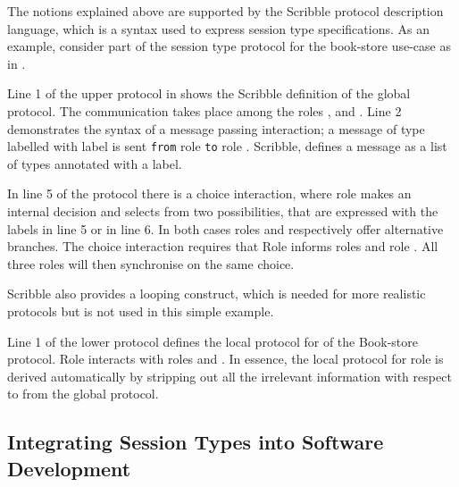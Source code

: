 \label{sec:scribble}
The notions explained above are supported by the
Scribble protocol description language,
which is a syntax used to express session type specifications.
As an example,
consider part of the session type protocol for the book-store
use-case as in .




Line 1 of the upper protocol in  shows the
Scribble definition of the global protocol.
The communication takes place
among the roles \BuyerOne, \BuyerTwo and \Seller. Line 2 demonstrates
the syntax of a message passing interaction; a message
of type  labelled with label  is sent \lstinline|from|
role \BuyerOne \lstinline|to| role \Seller. Scribble, defines a message 
as a list of types annotated with a label.

In line 5 of the protocol
there is a choice interaction,
where role \BuyerTwo makes an internal decision and selects
from two possibilities, that are
expressed with the labels  in line 5 or  in line 6.
In  both cases roles \BuyerOne and \Seller respectively offer
alternative branches. The choice interaction requires that
Role \BuyerTwo informs roles \BuyerOne and role \Seller. All
three roles will then synchronise on the same choice.

Scribble also provides a looping construct, which is needed for more realistic protocols but is not used in this simple example.


Line 1 of the lower protocol defines the local protocol
for \BuyerOne of the Book-store protocol. Role \BuyerOne
interacts with roles \BuyerTwo and \Seller. In essence,
the local protocol for role \BuyerOne is derived automatically
by stripping out all the irrelevant information with respect
to \BuyerOne from the global protocol.



\subsection{Integrating Session Types into Software Development}%
\label{sec:sessions_integrate}

